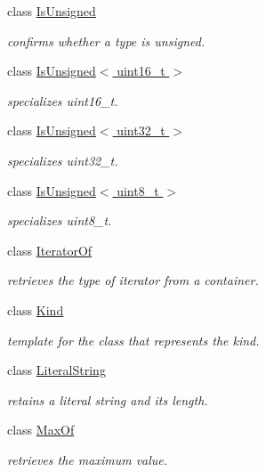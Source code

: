 \begin{DoxyCompactItemize}
class \hyperlink{classhryky_1_1_is_unsigned}{Is\-Unsigned}
\begin{DoxyCompactList}\small\item\em confirms whether a type is unsigned. \end{DoxyCompactList}\item 
class \hyperlink{classhryky_1_1_is_unsigned_3_01uint16__t_01_4}{Is\-Unsigned$<$ uint16\-\_\-t $>$}
\begin{DoxyCompactList}\small\item\em specializes uint16\-\_\-t. \end{DoxyCompactList}\item 
class \hyperlink{classhryky_1_1_is_unsigned_3_01uint32__t_01_4}{Is\-Unsigned$<$ uint32\-\_\-t $>$}
\begin{DoxyCompactList}\small\item\em specializes uint32\-\_\-t. \end{DoxyCompactList}\item 
class \hyperlink{classhryky_1_1_is_unsigned_3_01uint8__t_01_4}{Is\-Unsigned$<$ uint8\-\_\-t $>$}
\begin{DoxyCompactList}\small\item\em specializes uint8\-\_\-t. \end{DoxyCompactList}\item 
class \hyperlink{classhryky_1_1_iterator_of}{Iterator\-Of}
\begin{DoxyCompactList}\small\item\em retrieves the type of iterator from a container. \end{DoxyCompactList}\item 
class \hyperlink{classhryky_1_1_kind}{Kind}
\begin{DoxyCompactList}\small\item\em template for the class that represents the kind. \end{DoxyCompactList}\item 
class \hyperlink{classhryky_1_1_literal_string}{Literal\-String}
\begin{DoxyCompactList}\small\item\em retains a literal string and its length. \end{DoxyCompactList}\item 
class \hyperlink{classhryky_1_1_max_of}{Max\-Of}
\begin{DoxyCompactList}\small\item\em retrieves the maximum value. \end{DoxyCompactList}\item 

\end{DoxyCompactItemize}
